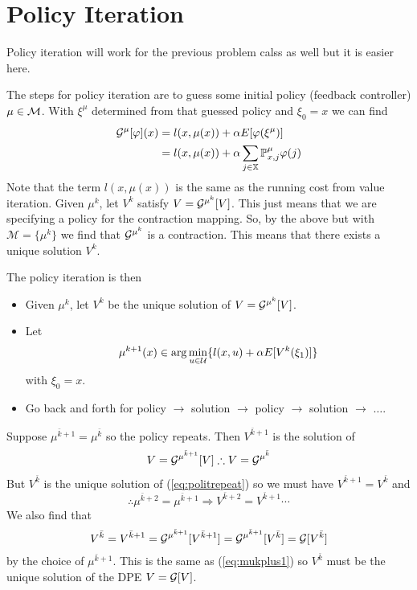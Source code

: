 \section{Policy Iteration}
Policy iteration will work for the previous problem calss as well but it is easier here.

The steps for policy iteration are to guess some initial policy (feedback controller) $\mu\in\mathcal{M}$. With $\xi^\mu$ determined from that guessed policy and $\xi_0=x$ we can find
\begin{align*}
\mathcal{G}^\mu[\varphi](x) &= l(x,\mu(x))+\alpha E[\varphi(\xi^\mu)] \\
&= l(x,\mu(x)) + \alpha\sum_{j\in\mathbb{X}}\mathbb{P}_{x,j}^\mu\varphi(j)
\end{align*}
Note that the term $l(x,\mu(x))$ is the same as the running cost from value iteration. Given $\mu^k$, let $V^k$ satisfy $V=\mathcal{G}^{\mu^k}[V]$. This just means that we are specifying a policy for the contraction mapping. So, by the above but with $\mathcal{M}=\{\mu^k\}$ we find that $\mathcal{G}^{\mu^k}$ is a contraction. This means that there exists a unique solution $V^k$.

The policy iteration is then
\begin{itemize}
\item Given $\mu^k$, let $V^k$ be the unique solution of $V=\mathcal{G}^{\mu^k}[V]$.
\item Let
\begin{align}
\label{eq:mukplus1}
\mu^{k+1}(x)\in\arg\min_{u\in\mathcal{U}}\{l(x,u)+\alpha E[V^k(\xi_1)]\}
\end{align}
with $\xi_0=x$.
\item Go back and forth for policy $\to$ solution $\to$ policy $\to$ solution $\to$ $\ldots$.
\end{itemize}

Suppose $\mu^{\bar{k}+1}=\mu^{\bar{k}}$ so the policy repeats. Then $V^{\bar{k}+1}$ is the solution of
\begin{align}
\label{eq:politrepeat}
V=\mathcal{G}^{\mu^{\bar{k}+1}}[V] \therefore V=\mathcal{G}^{\mu^{\bar{k}}}
\end{align}
But $V^{\bar{k}}$ is the unique solution of (\ref{eq:politrepeat}) so we must have $V^{\bar{k}+1}=V^{\bar{k}}$ and
$$\therefore \mu^{\bar{k}+2}=\mu^{\bar{k}+1} \Rightarrow V^{\bar{k}+2}=V^{\bar{k}+1} \cdots$$
We also find that
$$V^{\bar{k}} = V^{\bar{k}+1} = \mathcal{G}^{\mu^{\bar{k}+1}}[V^{\bar{k}+1}] = \mathcal{G}^{\mu^{\bar{k}+1}}[V^{\bar{k}}] = \mathcal{G}[V^{\bar{k}}]$$
by the choice of $\mu^{\bar{k}+1}$. This is the same as (\ref{eq:mukplus1}) so $V^{\bar{k}}$ must be the unique solution of the DPE $V=\mathcal{G}[V]$.

